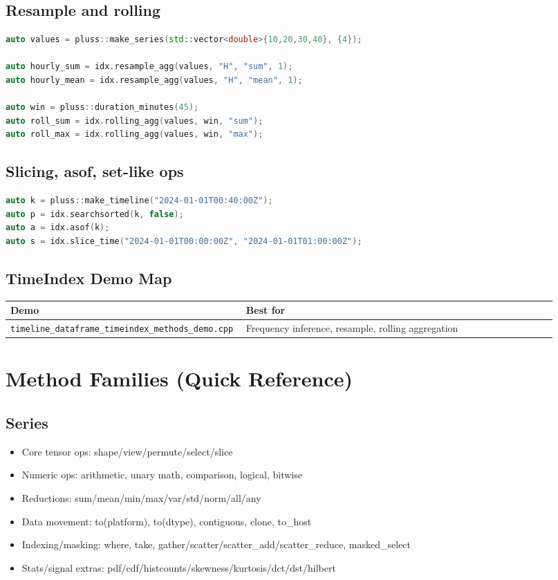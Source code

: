 \documentclass[11pt]{article}
\begin{document}
\subsection{Resample and rolling}
\begin{lstlisting}[language=C++]
auto values = pluss::make_series(std::vector<double>{10,20,30,40}, {4});

auto hourly_sum = idx.resample_agg(values, "H", "sum", 1);
auto hourly_mean = idx.resample_agg(values, "H", "mean", 1);

auto win = pluss::duration_minutes(45);
auto roll_sum = idx.rolling_agg(values, win, "sum");
auto roll_max = idx.rolling_agg(values, win, "max");
\end{lstlisting}

\subsection{Slicing, asof, set-like ops}
\begin{lstlisting}[language=C++]
auto k = pluss::make_timeline("2024-01-01T00:40:00Z");
auto p = idx.searchsorted(k, false);
auto a = idx.asof(k);
auto s = idx.slice_time("2024-01-01T00:00:00Z", "2024-01-01T01:00:00Z");
\end{lstlisting}

\subsection{TimeIndex Demo Map}
\begin{longtable}{@{}p{0.36\linewidth}p{0.56\linewidth}@{}}
\textbf{Demo} & \textbf{Best for} \\
\hline
\texttt{timeline\_dataframe\_timeindex\_methods\_demo.cpp} & Frequency inference, resample, rolling aggregation \\
\end{longtable}

\section{Method Families (Quick Reference)}
\subsection{Series}
\begin{itemize}[leftmargin=1.5em]
  \item Core tensor ops: shape/view/permute/select/slice
  \item Numeric ops: arithmetic, unary math, comparison, logical, bitwise
  \item Reductions: sum/mean/min/max/var/std/norm/all/any
  \item Data movement: to(platform), to(dtype), contiguous, clone, to\_host
  \item Indexing/masking: where, take, gather/scatter/scatter\_add/scatter\_reduce, masked\_select
  \item Stats/signal extras: pdf/cdf/histcounts/skewness/kurtosis/dct/dst/hilbert
\end{itemize}
\end{document}
